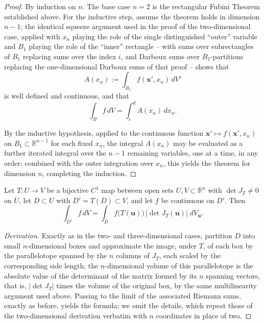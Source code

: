 \begin{proof}
By induction on $n$. The base case $n=2$ is the rectangular Fubini Theorem established above. For the inductive step, assume the theorem holds in dimension $n-1$; the identical squeeze argument used in the proof of the two-dimensional case, applied with $x_n$ playing the role of the single distinguished ``outer'' variable and $B_1$ playing the role of the ``inner'' rectangle -- with sums over subrectangles of $B_1$ replacing sums over the index $i$, and Darboux sums over $B_1$-partitions replacing the one-dimensional Darboux sums of that proof -- shows that
\[
A(x_n) := \int_{B_1} f(\mathbf{x}',x_n)\, dV'
\]
is well defined and continuous, and that
\[
\int_B f\, dV = \int_c^d A(x_n)\, dx_n.
\]

By the inductive hypothesis, applied to the continuous function $\mathbf{x}' \mapsto f(\mathbf{x}',x_n)$ on $B_1 \subset \mathbb{R}^{n-1}$ for each fixed $x_n$, the integral $A(x_n)$ may be evaluated as a further iterated integral over the $n-1$ remaining variables, one at a time, in any order; combined with the outer integration over $x_n$, this yields the theorem for dimension $n$, completing the induction.
\end{proof}

\begin{theorem}
Let $T : U \to V$ be a bijective $C^1$ map between open sets $U,V \subset \mathbb{R}^n$ with $\det J_T \neq 0$ on $U$, let $D \subset U$ with $D' = T(D) \subset V$, and let $f$ be continuous on $D'$. Then
\[
\int_{D'} f\, dV = \int_D f\big(T(\mathbf{u})\big) \, |\det J_T(\mathbf{u})| \; dV_{\mathbf{u}}.
\]

\end{theorem}

\begin{proof}[Derivation]
Exactly as in the two- and three-dimensional cases, partition $D$ into small $n$-dimensional boxes and approximate the image, under $T$, of each box by the parallelotope spanned by the $n$ columns of $J_T$, each scaled by the corresponding side length; the $n$-dimensional volume of this parallelotope is the absolute value of the determinant of the matrix formed by its $n$ spanning vectors, that is, $|\det J_T|$ times the volume of the original box, by the same multilinearity argument used above. Passing to the limit of the associated Riemann sums, exactly as before, yields the formula; we omit the details, which repeat those of the two-dimensional derivation verbatim with $n$ coordinates in place of two.
\end{proof}

